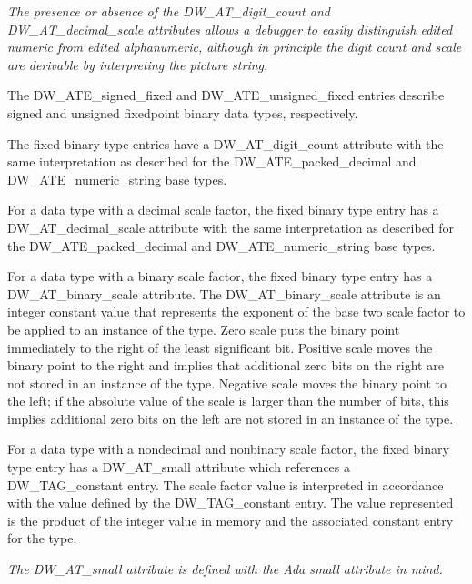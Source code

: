 \textit{The presence or absence of the DW\_AT\_digit\_count and
DW\_AT\_decimal\_scale attributes allows a debugger to easily
distinguish edited numeric from edited alphanumeric, although
in principle the digit count and scale are derivable by
interpreting the picture string.}

The DW\_ATE\_signed\_fixed and DW\_ATE\_unsigned\_fixed entries
describe signed and unsigned fixed\dash point binary data types,
respectively.

The fixed binary type entries have a DW\_AT\_digit\_count
attribute with the same interpretation as described for the
DW\_ATE\_packed\_decimal and DW\_ATE\_numeric\_string base types.

For a data type with a decimal scale factor, the fixed binary
type entry has a DW\_AT\_decimal\_scale attribute with the same
interpretation as described for the DW\_ATE\_packed\_decimal
and DW\_ATE\_numeric\_string base types.

For a data type with a binary scale factor, the fixed
binary type entry has a DW\_AT\_binary\_scale attribute. The
DW\_AT\_binary\_scale attribute is an integer constant value
that represents the exponent of the base two scale factor to
be applied to an instance of the type.  Zero scale puts the
binary point immediately to the right of the least significant
bit. Positive scale moves the binary point to the right and
implies that additional zero bits on the right are not stored
in an instance of the type. Negative scale moves the binary
point to the left; if the absolute value of the scale is
larger than the number of bits, this implies additional zero
bits on the left are not stored in an instance of the type.

For a data type with a non\dash decimal and non\dash binary scale factor,
the fixed binary type entry has a DW\_AT\_small attribute which
references a DW\_TAG\_constant entry. The scale factor value
is interpreted in accordance with the value defined by the
DW\_TAG\_constant entry. The value represented is the product
of the integer value in memory and the associated constant
entry for the type.

\textit{The DW\_AT\_small attribute is defined with the Ada small
attribute in mind.}


